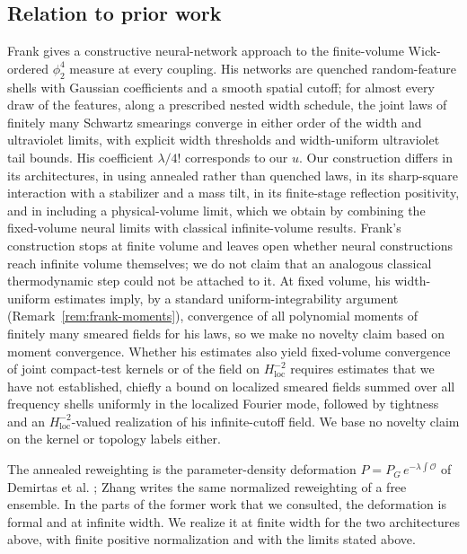\documentclass[11pt]{article}
\theoremstyle{plain}
\theoremstyle{definition}
\theoremstyle{remark}
\begin{document}
\subsection{Relation to prior work}\label{sec:prior-work}

Frank \cite{Frank2026v2} gives a constructive neural-network approach to the
finite-volume Wick-ordered $\phi^{4}_{2}$ measure at every coupling. His networks are
quenched random-feature shells with Gaussian coefficients and a smooth spatial
cutoff; for almost every draw of the features, along a prescribed nested width
schedule, the joint laws of finitely many Schwartz smearings converge in either
order of the width and ultraviolet limits, with explicit width thresholds and
width-uniform ultraviolet tail bounds. His coefficient $\lambda/4!$ corresponds to
our $u$. Our construction differs in its architectures, in using annealed rather
than quenched laws, in its sharp-square interaction with a stabilizer and a mass
tilt, in its finite-stage reflection positivity, and in including a
physical-volume limit, which we obtain by combining the fixed-volume neural
limits with classical infinite-volume results. Frank's construction stops at
finite volume and leaves open whether neural constructions reach infinite volume
themselves; we do not claim that an analogous classical thermodynamic step could
not be attached to it. At fixed volume, his width-uniform estimates imply, by a
standard uniform-integrability argument (Remark~\ref{rem:frank-moments}),
convergence of all polynomial moments of finitely many smeared fields for his
laws, so we make no novelty claim based on moment convergence. Whether his
estimates also yield fixed-volume convergence of joint compact-test kernels or of
the field on $H^{-2}_{\mathrm{loc}}$ requires estimates that we have not
established, chiefly a bound on localized smeared fields summed over all
frequency shells uniformly in the localized Fourier mode, followed by tightness
and an $H^{-2}_{\mathrm{loc}}$-valued realization of his infinite-cutoff field. We
base no novelty claim on the kernel or topology labels either.

The annealed reweighting is the parameter-density deformation
$P=P_G\,e^{-\lambda\int\mathcal{O}}$ of Demirtas et al.
\cite{DemirtasHalversonMaitiSchwartzStoner2023}; Zhang
\cite{Zhang2026OptimalArchitecture} writes the same normalized reweighting of a
free ensemble. In the parts of the former work that we consulted, the
deformation is formal and at infinite width. We realize it at finite width for
the two architectures above, with finite positive normalization and with the
limits stated above.
\end{document}
